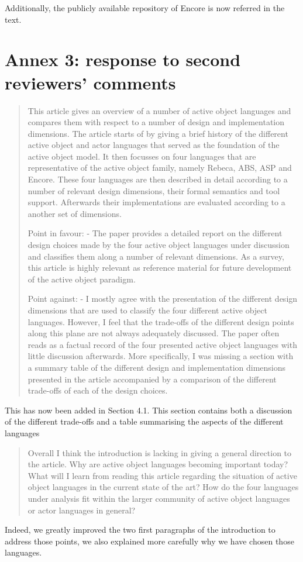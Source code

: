 \documentclass{article}
\begin{document}
Additionally,  the publicly available repository of Encore is now referred in the 
text.

\section*{Annex 3: response to second reviewers' comments}


\begin{quote}
	This article gives an overview of a number of active object languages and compares 
	them 
with respect to a number of design and implementation dimensions. The article starts of 
by giving a brief history of the different active object and actor languages that served 
as the foundation of the active object model. It then focusses on four languages that are 
representative of the active object family, namely Rebeca, ABS, ASP and Encore. These 
four languages are then described in detail according to a number of relevant design 
dimensions, their formal semantics and tool support. Afterwards their implementations are 
evaluated according to a another set of dimensions. 


Point in favour:
- The paper provides a detailed report on the different design choices made by the four 
active object languages under discussion and classifies them along a number of relevant 
dimensions. As a survey, this article is highly relevant as reference material for future 
development of the active object paradigm.

Point against:
- I mostly agree with the presentation of the different design dimensions that are used 
to classify the four different active object languages. However, I feel that the 
trade-offs of the different design points along this plane are not always adequately 
discussed. The paper often reads as a factual record of the four presented active object 
languages with little discussion afterwards. More specifically, I was missing a section 
with a summary table of the different design and implementation dimensions presented in 
the article accompanied by a comparison of the different trade-offs of each of the design 
choices.
\end{quote}
This has now been added in Section 4.1. This section contains both a discussion of the 
different trade-offs and a table summarising the aspects of the different languages

\begin{quote}
	Overall I think the introduction is lacking in giving a general direction to the 
article. Why are active object languages becoming important today? What will I learn from 
reading this article regarding the situation of active object languages in the current 
state of the art? How do the four languages under analysis fit within the larger 
community of active object languages or actor languages in general?
\end{quote}
Indeed, we greatly improved the two first paragraphs of the introduction to address those 
points, we also explained more carefully why we have chosen those languages.
\end{document}

